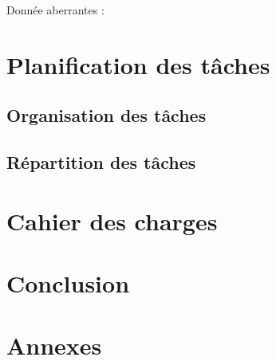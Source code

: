 \documentclass[a4paper,10pt]{article} %
\begin{document}
 
Donnée aberrantes :  




\section{Planification des tâches}

	\subsection{Organisation des tâches}

	\subsection{Répartition des tâches}



\section{Cahier des charges}


\section*{Conclusion}

\section*{Annexes}
\end{document}
